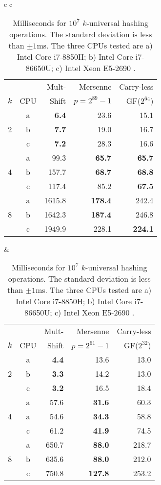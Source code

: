 \begin{table}[H]
   \centering
   \begin{tabular}{c c}
      \begin{tabular}{r c | r r r}
          &  &  Mult- & Mersenne       & Carry-less \\
          $k$   & CPU & Shift & $p=2^{89}-1$ & GF($2^{64}$) \\
         \hline
           & a & \textbf{6.4} & 23.6 & 15.1 \\
         2 & b & \textbf{7.7} & 19.0 & 16.7 \\
           & c & \textbf{7.2} & 28.3 & 16.6 \\
         \hline
           & a & 99.3 & \textbf{65.7} & \textbf{65.7} \\
         4 & b & 157.7 &\textbf{68.7}  & \textbf{68.8} \\
           & c & 117.4 & 85.2 & \textbf{67.5}\\
         \hline
             & a & 1615.8 & \textbf{178.4} & 242.4 \\
         8 & b &  1642.3 & \textbf{187.4} & 246.8 \\
           & c & 1949.9 & 228.1 & \textbf{224.1} \\
      \end{tabular}
      &
      \begin{tabular}{r c | r r r}
          &  &  Mult- & Mersenne       & Carry-less \\
          $k$   & CPU & Shift & $p=2^{61}-1$ & GF($2^{32}$) \\
         \hline
             & a & \textbf{4.4} & 13.6 & 13.0 \\
         2 & b & \textbf{3.3} & 14.2 & 13.0 \\
           & c & \textbf{3.2} & 16.5 & 18.4 \\
         \hline
           & a & 57.6 & \textbf{31.6} & 60.3 \\
         4 & a & 54.6 & \textbf{34.3}  & 58.8 \\
           & c & 61.2 & \textbf{41.9} & 74.5 \\
         \hline
           & a & 650.7 & \textbf{88.0} & 218.7 \\
         8 & b & 635.6   & \textbf{88.0} & 212.0 \\
           & c & 750.8 & \textbf{127.8} & 253.2 \\
      \end{tabular}
   \end{tabular}
   \caption{Milliseconds for $10^7$ $k$-universal hashing operations.
      The standard deviation is less than $\pm1$ms.
      The three CPUs tested are
         a) Intel Core i7-8850H; %
         b) Intel Core i7-86650U; %
         c) Intel Xeon E5-2690 %
         .
   }
   \label{tab:hashing-experiments}
\end{table}

